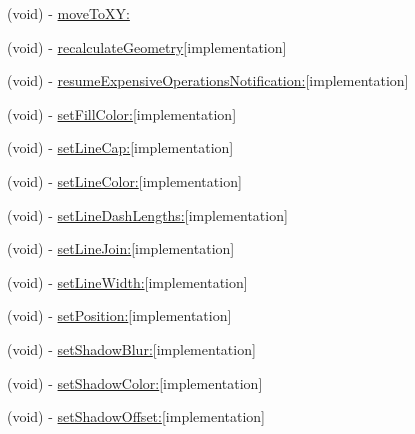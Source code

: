 \begin{DoxyCompactItemize}
(void) -\/ \hyperlink{interface_r_m_path_a8152252d92f15d9a64ced43b242e75f3}{move\-To\-X\-Y\-:}
\item 
(void) -\/ \hyperlink{interface_r_m_path_a49d02bb5a66b86321ef003a2e82fdaa4}{recalculate\-Geometry}{\ttfamily  \mbox{[}implementation\mbox{]}}
\item 
(void) -\/ \hyperlink{interface_r_m_path_adcebd60bb2931ac35682cd98663df01b}{resume\-Expensive\-Operations\-Notification\-:}{\ttfamily  \mbox{[}implementation\mbox{]}}
\item 
(void) -\/ \hyperlink{interface_r_m_path_a9dbaa031097817f66fb60a08b0152f03}{set\-Fill\-Color\-:}{\ttfamily  \mbox{[}implementation\mbox{]}}
\item 
(void) -\/ \hyperlink{interface_r_m_path_a26399b883723e767df48cc65103f49ef}{set\-Line\-Cap\-:}{\ttfamily  \mbox{[}implementation\mbox{]}}
\item 
(void) -\/ \hyperlink{interface_r_m_path_a1189f1035fce44a2cd33a7ec908ff6eb}{set\-Line\-Color\-:}{\ttfamily  \mbox{[}implementation\mbox{]}}
\item 
(void) -\/ \hyperlink{interface_r_m_path_aac24db1aea9ae5f3fbe07d4689d9b6e6}{set\-Line\-Dash\-Lengths\-:}{\ttfamily  \mbox{[}implementation\mbox{]}}
\item 
(void) -\/ \hyperlink{interface_r_m_path_aae7dd8305cb31482013fc9572c2b008e}{set\-Line\-Join\-:}{\ttfamily  \mbox{[}implementation\mbox{]}}
\item 
(void) -\/ \hyperlink{interface_r_m_path_a0e41e0d279a6be9e9560a391bfa4ed4a}{set\-Line\-Width\-:}{\ttfamily  \mbox{[}implementation\mbox{]}}
\item 
(void) -\/ \hyperlink{interface_r_m_path_a3594420667f2f8e13093716cb9e26a80}{set\-Position\-:}{\ttfamily  \mbox{[}implementation\mbox{]}}
\item 
(void) -\/ \hyperlink{interface_r_m_path_a8a39a0577a19fc38e05e64cbd3c233a5}{set\-Shadow\-Blur\-:}{\ttfamily  \mbox{[}implementation\mbox{]}}
\item 
(void) -\/ \hyperlink{interface_r_m_path_ab795b2187b18ee2397beb1945db1f4e3}{set\-Shadow\-Color\-:}{\ttfamily  \mbox{[}implementation\mbox{]}}
\item 
(void) -\/ \hyperlink{interface_r_m_path_a457d78db2535206b5c9c1653623e151f}{set\-Shadow\-Offset\-:}{\ttfamily  \mbox{[}implementation\mbox{]}}
\end{DoxyCompactItemize}
